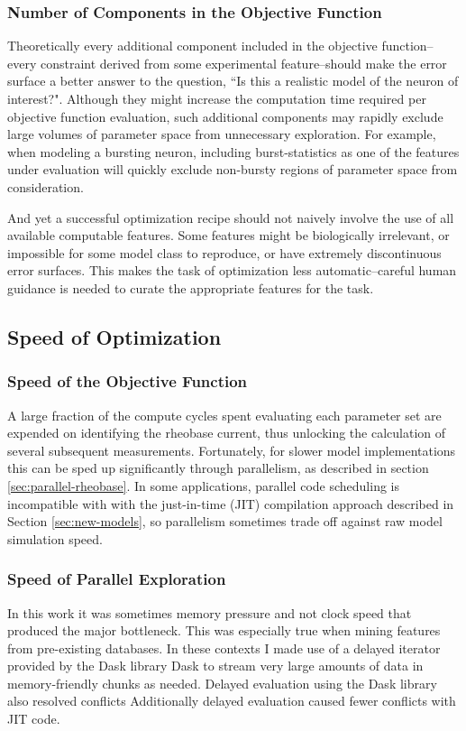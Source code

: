 \subsubsection{Number of Components in the Objective Function}
Theoretically every additional component included in the objective function--every constraint derived from some experimental feature--should make the error surface a better answer to the question, ``Is this a realistic model of the neuron of interest?".
Although they might increase the computation time required per objective function evaluation, such additional components may rapidly exclude large volumes of parameter space from unnecessary exploration.
For example, when modeling a bursting neuron, including burst-statistics as one of the features under evaluation will quickly exclude non-bursty regions of parameter space from consideration.

And yet a successful optimization recipe should not naively involve the use of all available computable features.
Some features might be biologically irrelevant, or impossible for some model class to reproduce, or have extremely discontinuous error surfaces.
This makes the task of optimization less automatic--careful human guidance is needed to curate the appropriate features for the task. 

\subsection{Speed of Optimization}
\subsubsection{Speed of the Objective Function}
A large fraction of the compute cycles spent evaluating each parameter set are expended on identifying the rheobase current, thus unlocking the calculation of several subsequent measurements.
Fortunately, for slower model implementations this can be sped up significantly through parallelism, as described in section \ref{sec:parallel-rheobase}.
In some applications, parallel code scheduling is incompatible with with the just-in-time (JIT) compilation approach described in Section \ref{sec:new-models}, so parallelism sometimes trade off against raw model simulation speed. 

\subsubsection{Speed of Parallel Exploration}
In this work it was sometimes memory pressure and not clock speed that produced the major bottleneck.
This was especially true when mining features from pre-existing databases.
In these contexts I made use of a delayed iterator provided by the Dask library Dask \citep{rocklin2015dask} to stream very large amounts of data in memory-friendly chunks as needed.
Delayed evaluation using the Dask library also resolved conflicts Additionally delayed evaluation caused fewer conflicts with JIT code.

